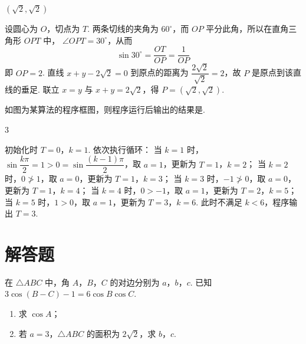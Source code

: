 \begin{answer}
\((\sqrt{2},\sqrt{2})\)
\end{answer}

\begin{solution}
设圆心为 \(O\)，切点为 \(T\). 两条切线的夹角为 \(60^\circ\)，而 \(OP\) 平分此角，所以在直角三角形 \(OPT\) 中，
\(\angle OPT=30^\circ\)，从而
\[
\sin30^\circ=\frac{OT}{OP}=\frac{1}{OP}
\]
即 \(OP=2\). 直线 \(x+y-2\sqrt2=0\) 到原点的距离为
\(\dfrac{2\sqrt2}{\sqrt2}=2\)，故 \(P\) 是原点到该直线的垂足. 联立
\(x=y\) 与 \(x+y=2\sqrt2\)，得 \(P=(\sqrt2,\sqrt2)\).
\end{solution}

\begin{problem}
如图为某算法的程序框图，则程序运行后输出的结果是\fillinblank{}.

\end{problem}

\begin{answer}
3
\end{answer}

\begin{solution}
初始化时 \(T=0\)，\(k=1\). 依次执行循环：
当 \(k=1\) 时，\(\sin\dfrac{k\pi}{2}=1>0=\sin\dfrac{(k-1)\pi}{2}\)，取 \(a=1\)，更新为 \(T=1\)，\(k=2\)；
当 \(k=2\) 时，\(0\not>1\)，取 \(a=0\)，更新为 \(T=1\)，\(k=3\)；
当 \(k=3\) 时，\(-1\not>0\)，取 \(a=0\)，更新为 \(T=1\)，\(k=4\)；
当 \(k=4\) 时，\(0>-1\)，取 \(a=1\)，更新为 \(T=2\)，\(k=5\)；
当 \(k=5\) 时，\(1>0\)，取 \(a=1\)，更新为 \(T=3\)，\(k=6\). 此时不满足 \(k<6\)，程序输出 \(T=3\).
\end{solution}

\section{解答题}

\begin{problem}
在 \(\triangle ABC\) 中，角 \(A\)，\(B\)，\(C\) 的对边分别为 \(a\)，\(b\)，\(c\). 已知 \(3\cos (B - C) - 1 = 6\cos B\cos C\).
\begin{enumerate}
\item 求 \( \cos A \)；
\item 若 \(a = 3\)，\(\triangle ABC\) 的面积为 \(2\sqrt{2}\)，求 \(b\)，\(c\).
\end{enumerate}
\end{problem}

